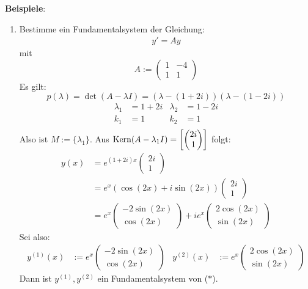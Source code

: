 \documentclass[a4paper,oneside,DIV15,BCOR12mm,chapterprefix=true,headings=onelinechapter]{scrbook}
\begin{document}
\textbf{Beispiele}:

\begin{enumerate}
\item Bestimme ein Fundamentalsystem der Gleichung:
\begin{align*}
\tag{$\ast $} y' = Ay
\end{align*}
mit 
\[A:=\begin{pmatrix} 1 & -4 \\ 1 & 1  \end{pmatrix}\]
Es gilt:
\[p(\lambda)=\det(A-\lambda I) = (\lambda - (1 + 2i))(\lambda-(1-2i))\]
\begin{align*}
\lambda_1 &= 1 + 2i &\lambda_2 &= 1-2i\\
k_1 &= 1 &k_2&=1\\
\end{align*}
Also ist $M := \{\lambda_1\}$. Aus $\mathop{\rm Kern}\nolimits(A-\lambda_1 I) = \left[ \begin{pmatrix} 2i \\ 1 \end{pmatrix} \right]$
folgt:
\begin{align*}
y(x) &= e^{(1+2i)x} \begin{pmatrix} 2i \\ 1 \end{pmatrix} \\ 
&= e^x (\cos(2x) + i \sin(2x)) \begin{pmatrix} 2i \\ 1 \end{pmatrix}\\ 
&= e^x \begin{pmatrix} -2\sin(2x) \\ \cos(2x) \end{pmatrix} 
+ ie^x \begin{pmatrix} 2\cos(2x) \\ \sin(2x) \end{pmatrix} 
\end{align*}
Sei also:
\begin{align*}
y^{(1)}(x)&:=e^x \begin{pmatrix} -2\sin(2x) \\ \cos(2x) \end{pmatrix}&
y^{(2)}(x)&:=e^x \begin{pmatrix} 2\cos(2x) \\ \sin(2x) \end{pmatrix}
\end{align*}
Dann ist $y^{(1)}, y^{(2)}$ ein Fundamentalsystem von ($\ast$).


\end{enumerate}
\end{document}
